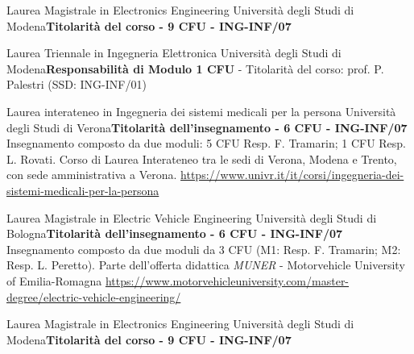 {
{\newline Laurea Magistrale in Electronics Engineering}
{Università degli Studi di Modena}{\newline \textbf{Titolarità del corso - 9 CFU - ING-INF/07}}{}

{\newline Laurea Triennale in Ingegneria Elettronica}
{Università degli Studi di Modena}{\newline \textbf{Responsabilità di Modulo 1 CFU} - Titolarità del corso: prof. P. Palestri (SSD: ING-INF/01)}{}

{Laurea interateneo in Ingegneria dei sistemi medicali per la persona}
{Università degli Studi di Verona}{\newline \textbf{Titolarità dell'insegnamento - 6 CFU - ING-INF/07}}{
    Insegnamento composto da due moduli: 5 CFU Resp. F. Tramarin; 1 CFU Resp. L. Rovati.\newline
    Corso di Laurea Interateneo tra le sedi di Verona, Modena e Trento, con sede amministrativa a Verona.\newline
    \href{https://www.univr.it/it/corsi/ingegneria-dei-sistemi-medicali-per-la-persona}{https://www.univr.it/it/corsi/ingegneria-dei-sistemi-medicali-per-la-persona}}

{Laurea Magistrale in Electric Vehicle Engineering}
{Università degli Studi di Bologna}{\newline \textbf{Titolarità dell'insegnamento - 6 CFU - ING-INF/07}}{
    Insegnamento composto da due moduli da 3 CFU (M1: Resp. F. Tramarin; M2: Resp. L. Peretto).\newline
    Parte dell'offerta didattica \textit{MUNER} - Motorvehicle University of Emilia-Romagna \newline \href{https://www.motorvehicleuniversity.com/master-degree/electric-vehicle-engineering/}{https://www.motorvehicleuniversity.com/master-degree/electric-vehicle-engineering/}}

{\newline Laurea Magistrale in Electronics Engineering}
{Università degli Studi di Modena}{\newline \textbf{Titolarità del corso - 9 CFU - ING-INF/07}}{}

}
